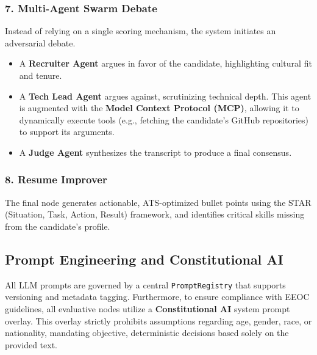 \subsubsection{7. Multi-Agent Swarm Debate}
Instead of relying on a single scoring mechanism, the system initiates an adversarial debate. 
\begin{itemize}
    \item A \textbf{Recruiter Agent} argues in favor of the candidate, highlighting cultural fit and tenure.
    \item A \textbf{Tech Lead Agent} argues against, scrutinizing technical depth. This agent is augmented with the \textbf{Model Context Protocol (MCP)}, allowing it to dynamically execute tools (e.g., fetching the candidate's GitHub repositories) to support its arguments.
    \item A \textbf{Judge Agent} synthesizes the transcript to produce a final consensus.
\end{itemize}

\subsubsection{8. Resume Improver}
The final node generates actionable, ATS-optimized bullet points using the STAR (Situation, Task, Action, Result) framework, and identifies critical skills missing from the candidate's profile.

\subsection{Prompt Engineering and Constitutional AI}
All LLM prompts are governed by a central \texttt{PromptRegistry} that supports versioning and metadata tagging. Furthermore, to ensure compliance with EEOC guidelines, all evaluative nodes utilize a \textbf{Constitutional AI} system prompt overlay. This overlay strictly prohibits assumptions regarding age, gender, race, or nationality, mandating objective, deterministic decisions based solely on the provided text.
